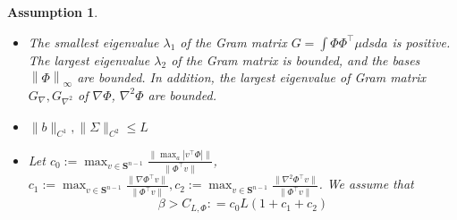 \documentclass[12pt]{article}
\newtheorem{assumption}{Assumption}
\def\lam{\lambda}
\def\ll{\left\lVert}
\def\rl{\right\rVert}
\def\nb{\nabla}
\begin{document}
\begin{assumption}\label{ass-conv}
\begin{itemize}

     \item [(A1)] The smallest eigenvalue $\lam_1$ of the Gram matrix $G = \int \Phi\Phi^\top \mu dsda$  is positive. The largest eigenvalue $\lam_2$ of the Gram matrix is bounded, and the bases $\ll\Phi\rl_\infty$ are bounded. In addition, the largest eigenvalue of Gram matrix $G_\nb, G_{\nb^2}$ of $\nb\Phi$, $\nb^2\Phi$ are bounded.
     \item[(A2)] $\| b\|_{C^1} , \|\Sigma\|_{C^2} \leq L$
     \item[(A3)]    Let $c_0 := \max_{v\in \mathbf{S}^{n-1}}\frac{\|\max_a |v^\top \Phi|\|}{\|\Phi^\top v\|}$, $c_1 := \max_{v\in \mathbf{S}^{n-1}}\frac{\|\nabla\Phi^\top v  \|}{\|\Phi^\top v\|}, c_2 := \max_{v\in \mathbf{S}^{n-1}}\frac{\|\nabla^2\Phi^\top v  
           \|}{\|\Phi^\top v\|}$. We assume that 
    \begin{equation}\label{def of cbeta}
        \beta > C_{L,\Phi}: = c_0 L (1+c_1+c_2)
    \end{equation}

\end{itemize} 
\end{assumption}
\end{document}
